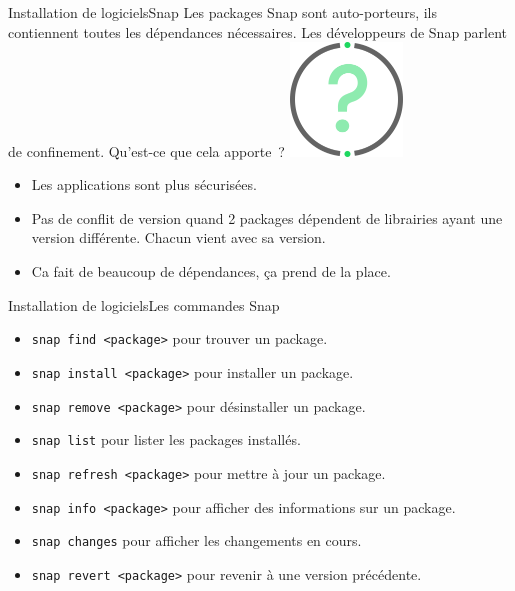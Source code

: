 \documentclass{beamer}
\begin{document}
    \begin{frame}{Installation de logiciels}{Snap}
        Les packages Snap sont auto-porteurs, ils contiennent toutes les dépendances nécessaires.
        Les développeurs de Snap parlent de confinement.
        \bigbreak
        Qu'est-ce que cela apporte~?
        \bigbreak
        \centering
        \includegraphics[width=3cm]{image/question-mark}
        \pause
        \begin{itemize}
            \item Les applications sont plus sécurisées.
            \item Pas de conflit de version quand 2 packages dépendent de librairies ayant une version différente.
            Chacun vient avec sa version.
            \item Ca fait de beaucoup de dépendances, ça prend de la place.
        \end{itemize}
    \end{frame}

    \begin{frame}{Installation de logiciels}{Les commandes Snap}
        \begin{itemize}
            \item \lstinline{snap find <package>} pour trouver un package.
            \item \lstinline{snap install <package>} pour installer un package.
            \item \lstinline{snap remove <package>} pour désinstaller un package.
            \item \lstinline{snap list} pour lister les packages installés.
            \item \lstinline{snap refresh <package>} pour mettre à jour un package.
            \item \lstinline{snap info <package>} pour afficher des informations sur un package.
            \item \lstinline{snap changes} pour afficher les changements en cours.
            \item \lstinline{snap revert <package>} pour revenir à une version précédente.
        \end{itemize}
    \end{frame}
\end{document}
